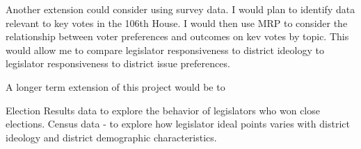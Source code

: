 \documentclass[10pt,letterpaper]{article}
\begin{document}
Another extension could consider using survey data. I would plan to identify data relevant to key votes in the 106th House. I would then use MRP to consider the relationship between voter preferences and outcomes on kev votes by topic. This would allow me to compare legislator responsiveness to district ideology to legislator responsiveness to district issue preferences.


A longer term extension of this project would be to 

Election Results data to explore the behavior of legislators who won close elections.
Census data - to explore how legislator ideal points varies with district ideology and district demographic characteristics. 






\newpage

\newpage


\end{document}
